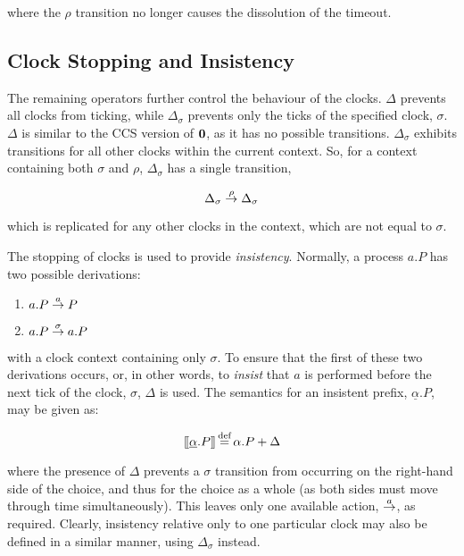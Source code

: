 \noindent where the $\rho$ transition no longer causes the dissolution
of the timeout.

\subsection{Clock Stopping and Insistency}
\label{clockcontrol}

The remaining operators further control the behaviour of the clocks.
$\Delta$ prevents all clocks from ticking, while $\Delta_{\sigma}$
prevents only the ticks of the specified clock, $\sigma$.  $\Delta$ is
similar to the CCS version of $\textbf{0}$, as it has no possible
transitions.  $\Delta_{\sigma}$ exhibits transitions for all other
clocks within the current context.  So, for a context containing both
$\sigma$ and $\rho$, $\Delta_{\sigma}$ has a single transition,

\begin{equation}
  \Delta_{\sigma} \stackrel{\rho}{\rightarrow} \Delta_{\sigma}
\end{equation}

\noindent which is replicated for any other clocks in the context,
which are not equal to $\sigma$.

The stopping of clocks is used to provide \emph{insistency}.  Normally,
a process $a.P$ has two possible derivations:

\begin{enumerate}
  \item $a.P \stackrel{a}{\rightarrow} P$
  \item $a.P \stackrel{\sigma}{\rightarrow} a.P$
\end{enumerate}

\noindent with a clock context containing only $\sigma$.  To ensure
that the first of these two derivations occurs, or, in other words, to
\emph{insist} that $a$ is performed before the next tick of the clock,
$\sigma$, $\Delta$ is used.  The semantics for an insistent prefix,
$\underline{\alpha}.P$, may be given as:

\begin{equation}
[\hspace{-0.3ex}[ \underline{\alpha}.P ]\hspace{-0.3ex}] \operatorname{\stackrel{\textrm{def}}{=}} \alpha.P + \Delta 
\end{equation}

\noindent where the presence of $\Delta$ prevents a $\sigma$
transition from occurring on the right-hand side of the choice, and
thus for the choice as a whole (as both sides must move through time
simultaneously).  This leaves only one available action,
$\stackrel{a}{\rightarrow}$, as required.  Clearly, insistency relative only to one
particular clock may also be defined in a similar manner, using
$\Delta_{\sigma}$ instead.

